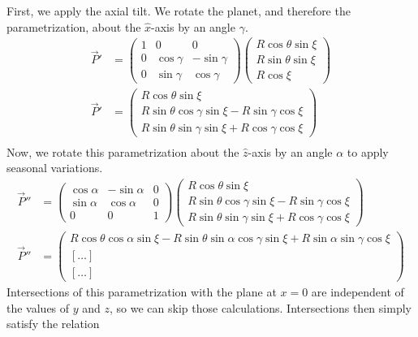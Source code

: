 \documentclass[12pt,a4paper]{article}
\begin{document}
First, we apply the axial tilt. We rotate the planet, and therefore the parametrization, about the \(\hat{x}\)-axis by an angle \(\gamma\).  
\begin{align}
\vec{P}'&= \left(\begin{array}{ccc} 1 & 0 & 0\\ 0 & \cos\gamma & -\sin\gamma \\ 0 & \sin\gamma & \cos\gamma \end{array}\right)\left(\begin{array}{c} R\cos\theta\sin\xi \\ R\sin\theta\sin\xi \\ R\cos\xi \end{array}\right) \\
\vec{P}'&=\left(\begin{array}{c} R\cos\theta\sin\xi \\ R\sin\theta\cos\gamma\sin\xi - R\sin\gamma\cos\xi \\ R\sin\theta\sin\gamma\sin\xi + R\cos\gamma\cos\xi  \end{array}\right) \\
\end{align}
Now, we rotate this parametrization about the \(\hat{z}\)-axis by an angle \(\alpha\) to apply seasonal variations.
\begin{align}
\vec{P}''&= \left(\begin{array}{ccc} \cos\alpha & -\sin\alpha & 0 \\ \sin\alpha & \cos\alpha & 0 \\ 0 & 0 & 1 \end{array}\right)\left(\begin{array}{c} R\cos\theta\sin\xi \\ R\sin\theta\cos\gamma\sin\xi - R\sin\gamma\cos\xi \\ R\sin\theta\sin\gamma\sin\xi + R\cos\gamma\cos\xi  \end{array}\right) \\
\vec{P}''&= \left(\begin{array}{c} R\cos\theta\cos\alpha\sin\xi -R \sin\theta\sin\alpha\cos\gamma\sin\xi + R\sin\alpha\sin\gamma\cos\xi \\ \left[\ldots\right] \\\left[\ldots\right] \end{array}\right) 
\end{align}
Intersections of this parametrization with the plane at \(x=0\) are independent of the values of \(y\) and \(z\), so we can skip those calculations. Intersections then simply satisfy the relation
\end{document}
